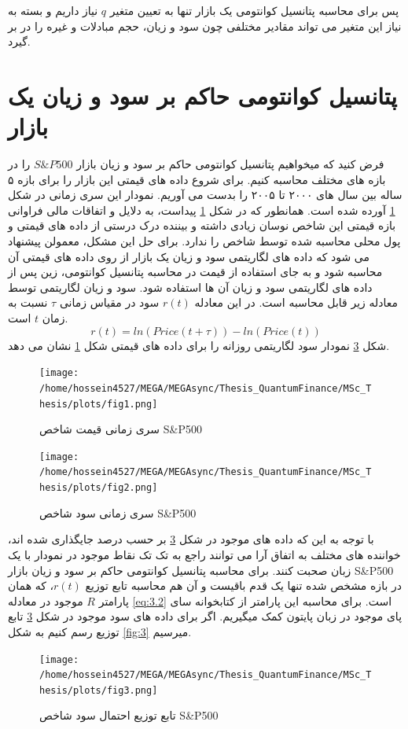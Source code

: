 \documentclass[a4paper,titlepage,12pt,fleqn,oneside]{report}
\begin{document}
پس برای محاسبه پتانسیل کوانتومی یک بازار تنها به تعیین متغیر $q$ نیاز داریم و بسته به نیاز این متغیر می تواند مقادیر مختلفی چون سود و زیان، حجم مبادلات و غیره را در بر گیرد. 
\section{پتانسیل کوانتومی حاکم بر سود و زیان یک بازار}
فرض کنید که میخواهیم پتانسیل کوانتومی  حاکم بر سود و زیان بازار 
$S\&P500$
را در بازه های مختلف محاسبه کنیم.
برای شروع داده های قیمتی  این بازار را برای بازه ۵ ساله بین سال های ۲۰۰۰ تا ۲۰۰۵ را بدست می آوریم. نمودار این سری زمانی در شکل
\ref{fig:1}
 آورده شده است.
همانطور که در شکل 
\ref{fig:1}
پیداست، به دلایل و اتفاقات مالی فراوانی بازه قیمتی این شاخص نوسان زیادی داشته و بیننده درک درستی از داده های قیمتی و پول محلی محاسبه شده توسط شاخص را ندارد. برای حل این مشکل، معمولن پیشنهاد می شود که داده های لگاریتمی سود و زیان یک بازار از روی داده های قیمتی آن محاسبه شود و به جای استفاده از قیمت در محاسبه پتانسیل کوانتومی، زین پس از داده های لگاریتمی سود و زیان آن ها استفاده شود. سود و زیان لگاریتمی توسط معادله زیر قابل محاسبه است. در این معادله $r(t)$  سود در مقیاس زمانی $\tau$ نسبت به زمان $t$ است.
\begin{equation}
r(t) = ln\left(Price(t+\tau)\right)-ln\left(Price\left(t\right)\right)
\label{eq:3.2}
\end{equation}
شکل 
\ref{fig:2}
نمودار سود لگاریتمی روزانه را برای داده های قیمتی شکل 
\ref{fig:1}
نشان می دهد.
\begin{figure}[ptb]
	\centering
	\texttt{[image: /home/hossein4527/MEGA/MEGAsync/Thesis\_QuantumFinance/MSc\_Thesis/plots/fig1.png]}
	\caption{سری زمانی قیمت شاخص S\&P500}
	\label{fig:1}
\end{figure}
\begin{figure}[ptb]
	\centering
	\texttt{[image: /home/hossein4527/MEGA/MEGAsync/Thesis\_QuantumFinance/MSc\_Thesis/plots/fig2.png]}
	\caption{سری زمانی سود شاخص S\&P500}
	\label{fig:2}
\end{figure}
با توجه به این که داده های موجود در شکل 
\ref{fig:2}
بر حسب درصد جایگذاری شده اند، خواننده های مختلف به اتفاق آرا می توانند راجع به تک تک نقاط موجود در نمودار با یک زبان صحبت کنند.
برای محاسبه پتانسیل کوانتومی حاکم بر سود و زیان بازار 
S\&P500
در بازه مشخص شده تنها یک قدم باقیست و آن هم محاسبه تابع توزیع $r(t)$، که همان پارامتر $R$ موجود در معادله 
\ref{eq:3.2}
است. برای محاسبه این پارامتر از کتابخوانه سای پای موجود در زبان پایتون کمک میگیریم. اگر برای داده های سود موجود در شکل 
\ref{fig:2}
تابع توزیع رسم کنیم به شکل
\ref{fig:3}
میرسیم.
\begin{figure}[ptb]
	\centering
	\texttt{[image: /home/hossein4527/MEGA/MEGAsync/Thesis\_QuantumFinance/MSc\_Thesis/plots/fig3.png]}
	\caption{تابع توزیع احتمال سود شاخص S\&P500}
	\label{fig:2}
\end{figure}
\end{document}
